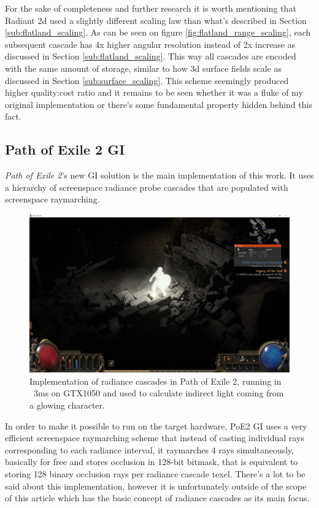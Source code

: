 \documentclass{jcgt}
\begin{document}
For the sake of completeness and further research it is worth mentioning that Radiant 2d used a slightly different scaling law than what's described in Section \ref{sub:flatland_scaling}. As can be seen on figure \ref{fig:flatland_range_scaling}, each subsequent cascade has 4x higher angular resolution instead of 2x increase as discussed in Section \ref{sub:flatland_scaling}. This way all cascades are encoded with the same amount of storage, similar to how 3d surface fields scale as discussed in Section \ref{sub:surface_scaling}. This scheme seemingly produced higher quality:cost ratio and it remains to be seen whether it was a fluke of my original implementation or there's some fundamental property hidden behind this fact.
\subsection{Path of Exile 2 GI}
\emph{Path of Exile 2}'s new GI solution is the main implementation of this work. It uses a hierarchy of screenspace radiance probe cascades that are populated with screenspace raymarching.

\begin{figure}[htb]
  \centering
  \includegraphics[width=\columnwidth]{images/ranger_gi.png}
  \caption{\label{fig:ranger_gi}
     Implementation of radiance cascades in Path of Exile 2, running in ~3ms on GTX1050 and used to calculate indirect light coming from a glowing character.}
\end{figure}
In order to make it possible to run on the target hardware, PoE2 GI uses a very efficient screenspace raymarching scheme that instead of casting individual rays corresponding to each radiance interval, it raymarches 4 rays simultaneously, basically for free and stores occlusion in 128-bit bitmask, that is equivalent to storing 128 binary occlusion rays per radiance cascade texel. There's a lot to be said about this implementation, however it is unfortunately outside of the scope of this article which has the basic concept of radiance cascades as its main focus.
\end{document}

